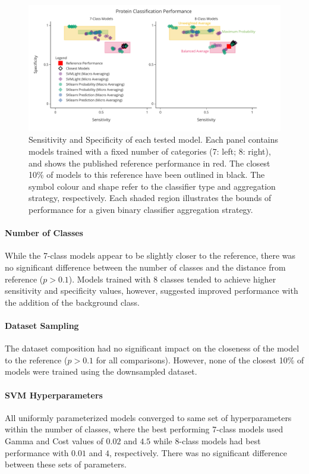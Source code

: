 \begin{figure}
  \centering
  \includegraphics[width=\textwidth]{figures/fig1_model_performance.pdf}
  \caption{Sensitivity and Specificity of each tested model. Each panel contains models trained with a fixed number of
categories (7: left; 8: right), and shows the published reference performance in red. The closest 10\% of models to
this reference have been outlined in black. The symbol colour and shape refer to the classifier type and aggregation
strategy, respectively. Each shaded region illustrates the bounds of performance for a given binary classifier
aggregation strategy.}
   \label{fig:7_class_model}
\end{figure}

\paragraph{Number of Classes}
While the 7-class models appear to be slightly closer to the reference, there was no significant difference between
the number of classes and the distance from reference ($p > 0.1$). Models trained with 8 classes tended to achieve
higher sensitivity and specificity values, however, suggested improved performance with the addition of the background
class. 

\paragraph{Dataset Sampling}
The dataset composition had no significant impact on the closeness of the model to the reference ($p > 0.1$ for all
comparisons). However, none of the closest 10\% of models were trained using the downsampled dataset.

\paragraph{SVM Hyperparameters}
All uniformly parameterized models converged to same set of hyperparameters within the number of classes, where the
best performing 7-class models used Gamma and Cost values of $0.02$ and $4.5$ while 8-class models had best performance
with $0.01$ and $4$, respectively. There was no significant difference between these sets of parameters.

